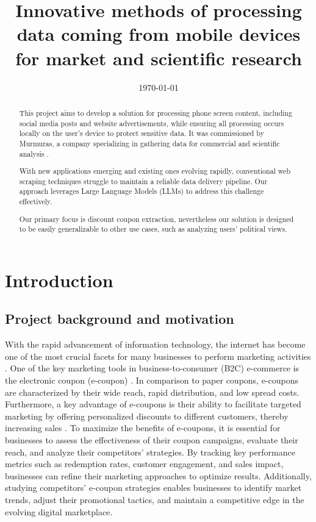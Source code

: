 \documentclass[licencjacka,en]{pracamgr}
\title{Innovative methods of processing data coming from mobile devices for market and scientific research}
\date{\today}
\begin{document}
\maketitle

\begin{abstract}
    This project aims to develop a solution for processing phone screen content, including social media posts and website advertisements, while ensuring all processing occurs locally on the user's device to protect sensitive data. It was commissioned by Murmuras, a company specializing in gathering data for commercial and scientific analysis \cite{murmuras}.
    
    With new applications emerging and existing ones evolving rapidly, conventional web scraping techniques struggle to maintain a reliable data delivery pipeline. Our approach leverages Large Language Models (LLMs) to address this challenge effectively.

    Our primary focus is discount coupon extraction, nevertheless our solution is designed to be easily generalizable to other use cases, such as analyzing users' political views.
\end{abstract}

\tableofcontents

\chapter{Introduction}
\section{Project background and motivation}
With the rapid advancement of information technology, the internet has become one of the most crucial facets for many businesses to perform marketing activities \cite{design_of_coupons}. One of the key marketing tools in business-to-consumer (B2C) e-commerce is the electronic coupon (e-coupon) \cite{targeted_reminders}. In comparison to paper coupons, e-coupons are characterized by their wide reach, rapid distribution, and low spread costs. Furthermore, a key advantage of e-coupons is their ability to facilitate targeted marketing by offering personalized discounts to different customers, thereby increasing sales \cite{design_of_coupons}. To maximize the benefits of e-coupons, it is essential for businesses to assess the effectiveness of their coupon campaigns, evaluate their reach, and analyze their competitors’ strategies. By tracking key performance metrics such as redemption rates, customer engagement, and sales impact, businesses can refine their marketing approaches to optimize results. Additionally, studying competitors' e-coupon strategies enables businesses to identify market trends, adjust their promotional tactics, and maintain a competitive edge in the evolving digital marketplace. 
\end{document}
